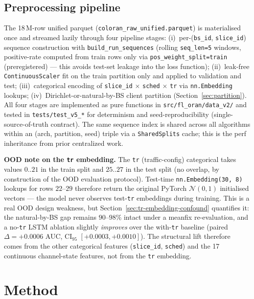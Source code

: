 \documentclass[journal]{IEEEtran}
\begin{document}
\subsection{Preprocessing pipeline}

The 18\,M-row unified parquet (\lstinline|coloran_raw_unified.parquet|) is materialised once and streamed lazily through four pipeline stages: (i)~per-(\lstinline|bs_id|, \lstinline|slice_id|) sequence construction with \lstinline|build_run_sequences| (rolling \lstinline|seq_len=5| windows, positive-rate computed from train rows only via \lstinline|pos_weight_split=train| (preregistered) --- this avoids test-set leakage into the loss function); (ii)~leak-free \lstinline|ContinuousScaler| fit on the train partition only and applied to validation and test; (iii)~categorical encoding of \lstinline|slice_id| $\times$ \lstinline|sched| $\times$ \lstinline|tr| via \lstinline|nn.Embedding| lookups; (iv)~Dirichlet-or-natural-by-BS client partition (Section~\ref{sec:partition}). All four stages are implemented as pure functions in \lstinline|src/fl_oran/data_v2/| and tested in \lstinline|tests/test_v5_*| for determinism and seed-reproducibility (single-source-of-truth contract). The same sequence index is shared across all algorithms within an (arch, partition, seed) triple via a \lstinline|SharedSplits| cache; this is the perf inheritance from prior centralized work.

\textbf{OOD note on the \lstinline|tr| embedding.} The \lstinline|tr| (traffic-config) categorical takes values $0..21$ in the train split and $25..27$ in the test split (no overlap, by construction of the OOD evaluation protocol). Test-time \lstinline|nn.Embedding(30, 8)| lookups for rows $22$--$29$ therefore return the original PyTorch $\mathcal{N}(0, 1)$ initialised vectors --- the model never observes test-\lstinline|tr| embeddings during training. This is a real OOD design weakness, but Section~\ref{sec:tr-embedding-confound} quantifies it: the natural-by-BS gap remains $90$--$98\%$ intact under a meanfix re-evaluation, and a no-\lstinline|tr| LSTM ablation slightly \emph{improves} over the with-\lstinline|tr| baseline (paired $\Delta = +0.0006$ AUC, CI$_{95}$ $[+0.0003, +0.0010]$). The structural lift therefore comes from the other categorical features (\lstinline|slice_id|, \lstinline|sched|) and the 17 continuous channel-state features, not from the \lstinline|tr| embedding.


\section{Method}\label{sec:method}
\end{document}
